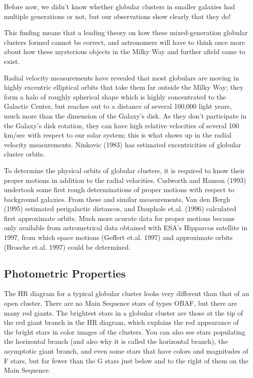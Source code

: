 Before now, we didn't know whether globular clusters in smaller galaxies had multiple generations or not, but our observations show clearly that they do!

This finding means that a leading theory on how these mixed-generation globular clusters formed cannot be correct, and astronomers will have to think once more about how these mysterious objects in the Milky Way and further afield came to exist.

Radial velocity measurements have revealed that most globulars are moving in highly excentric elliptical orbits that take them far outside the Milky Way; they form a halo of roughly spherical shape which is highly concentrated to the Galactic Center, but reaches out to a distance of several 100,000 light years, much more than the dimension of the Galaxy's disk. As they don't participate in the Galaxy's disk rotation, they can have high relative velocities of several 100 km/sec with respect to our solar system; this is what shows up in the radial velocity measurements. Ninkovic (1983) has estimated excentricities of globular cluster orbits.

To determine the physical orbits of globular clusters, it is required to know their proper motions in addition to the radial velocities. Cudworth and Hanson (1993) undertook some first rough determinations of proper motions with respect to background galaxies. From these and similar measurements, Van den Bergh (1995) estimated perigalactic distances, and Dauphole et.al. (1996) calculated first approximate orbits. Much more acurate data for proper motions became only available from astrometrical data obtained with ESA's Hipparcos satellite in 1997, from which space motions (Geffert et.al. 1997) and approximate orbits (Brosche et.al. 1997) could be determined.

\subsection{Photometric Properties}

The HR diagram for a typical globular cluster looks very different than that of an open cluster. There are no Main Sequence stars of types OBAF, but there are many red giants. The brightest stars in a globular cluster are those at the tip of the red giant branch in the HR diagram, which explains the red appearance of the bright stars in color images of the clusters. You can also see stars populating the horizontal branch (and also why it is called the horizontal branch), the asymptotic giant branch, and even some stars that have colors and magnitudes of F stars, but far fewer than the G stars just below and to the right of them on the Main Sequence.

